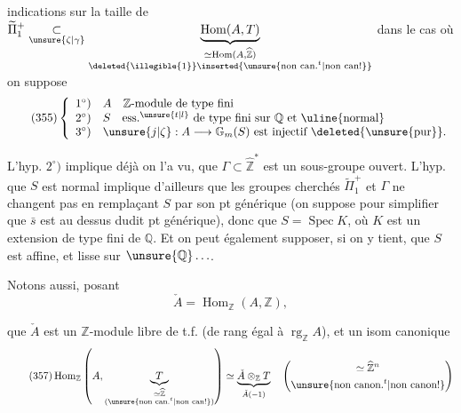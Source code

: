 

indications sur la taille de $\widetilde\Pi_1^{+}\underset{\unsure{\zeta|\gamma}}{\subset}\underbrace{\operatorname{Hom}(A,T)}_{\substack{\simeq\operatorname{Hom}(A,\widehat{\mathbb Z})\\\deleted{\illegible{1}}\inserted{\unsure{\text{non can.}^{t}|\text{non can!}}}}}$ dans le cas où on suppose
\[
\tag{355}
\left\{\begin{array}{ll}
1^\circ) & A\quad\mathbb Z\text{-module de type fini}\\
2^\circ) & S\quad\text{ess.}^{\unsure{t|l}}\text{ de type fini sur }\mathbb Q\text{ et \uline{normal}}\\
3^\circ) & \unsure{j|\zeta}:A\longrightarrow\mathbb G_m(S)\text{ est injectif }\deleted{\unsure{\text{pur}}}.
\end{array}\right.
\]

L'hyp. $2^\circ)$ implique déjà on l'a vu, que $\Gamma\subset\widehat{\mathbb Z}^{*}$ est un sous-groupe ouvert. L'hyp. que $S$ est normal implique d'ailleurs que les groupes cherchés $\widetilde\Pi_1^{+}$ et $\Gamma$ ne changent pas  en remplaçant $S$ par son pt générique (on suppose pour simplifier que $\bar s$ est au dessus dudit pt générique), donc  que $S=\operatorname{Spec}K$, où $K$ est un  extension de type fini de $\mathbb Q$. Et on peut également supposer, si on y tient, que $S$ est affine, et lisse sur $\unsure{\mathbb Q}\ldots$.

Notons aussi, posant
\[
\tag{356}
\check A=\operatorname{Hom}_{\mathbb Z}(A,\mathbb Z),
\]



que $\check A$ est un $\mathbb Z$-module libre de t.f. (de rang  égal à $\operatorname{rg}_{\mathbb Z}A$), et  un isom canonique
\[
\tag{357}
\operatorname{Hom}_{\mathbb Z}\left(A,\underbrace{T}_{\substack{\simeq\widehat{\mathbb Z}\\(\unsure{\text{non can.}^{t}|\text{non can!}})}}\right)
\simeq
\underbrace{\check A\otimes_{\mathbb Z}T}_{\check A(-1)}
\quad
\left(\begin{gathered}
\simeq\widehat{\mathbb Z}^{n}\\
\unsure{\text{non canon.}^{t}|\text{non canon!}}
\end{gathered}\right)
\]

